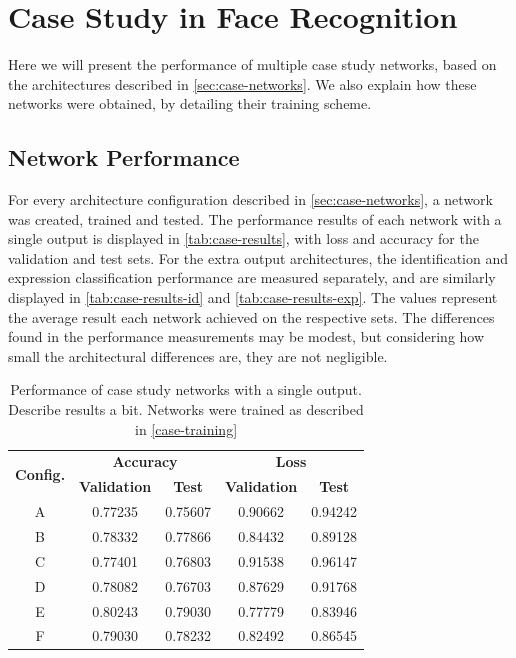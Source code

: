\section{Case Study in Face Recognition} \label{sec:case-results}

Here we will present the performance of multiple case study networks, based on the architectures described in \autoref{sec:case-networks}. We also explain how these networks were obtained, by detailing their training scheme. 

\subsection{Network Performance}

For every architecture configuration described in \autoref{sec:case-networks}, a network was created, trained and tested. The performance results of each network with a single output is displayed in \autoref{tab:case-results}, with loss and accuracy for the validation and test sets. For the extra output architectures, the identification and expression classification performance are measured separately, and are similarly displayed in \autoref{tab:case-results-id} and \autoref{tab:case-results-exp}. The values represent the average result each network achieved on the respective sets. The differences found in the performance measurements may be modest, but considering how small the architectural differences are, they are not negligible.



\begin{table}[h!]
\begin{center}
\begin{tabular}{|c|c|c|c|c|}
\hline
\multirow{2}{*}{\textbf{Config.}} & \multicolumn{2}{|c|}{\textbf{Accuracy}} & \multicolumn{2}{|c|}{\textbf{Loss}} \\ \cline{2-5}
 & \textbf{Validation} & \textbf{Test} & \textbf{Validation} & \textbf{Test} \\ \hline
A & 0.77235 & 0.75607 & 0.90662 & 0.94242 \\ \hline
B & 0.78332 & 0.77866 & 0.84432 & 0.89128 \\ \hline
C & 0.77401 & 0.76803 & 0.91538 & 0.96147 \\ \hline
D & 0.78082 & 0.76703 & 0.87629 & 0.91768 \\ \hline
E & 0.80243 & 0.79030 & 0.77779 & 0.83946 \\ \hline
F & 0.79030 & 0.78232 & 0.82492 & 0.86545 \\ \hline
\end{tabular}
\end{center}
\caption[Performance of case study networks with a single output]{Performance of case study networks with a single output. Describe results a bit. Networks were trained as described in \autoref{case-training}}
\label{tab:case-results}
\end{table}


